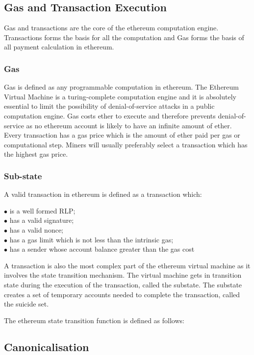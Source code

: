 \documentclass[a4paper,twoside,phd]{BYUPhys}
\begin{document}
\subsection{Gas and Transaction Execution}
Gas and transactions are the core of the ethereum computation engine. Transactions forms the basis for all the computation and Gas forms the basis of all payment calculation in ethereum.
\subsubsection{Gas}
Gas is defined as any programmable computation in ethereum. The Ethereum Virtual Machine is a turing-complete computation engine and it is absolutely essential to limit the possibility of denial-of-service attacks in a public computation engine. Gas costs ether to execute and therefore prevents denial-of-service as no ethereum account is likely to have an infinite amount of ether. Every transaction has a gas price which is the amount of ether paid per gas or computational step. Miners will usually preferably select a transaction which has the highest gas price.
\subsubsection{Sub-state}
A valid transaction in ethereum is defined as a transaction which:
\begin{description}
\item [$\bullet$ is a well formed RLP;]
\item [$\bullet$ has a valid signature;]
\item [$\bullet$ has a valid nonce;]
\item [$\bullet$ has a gas limit which is not less than the intrinsic gas;]
\item [$\bullet$ has a sender whose account balance greater than the gas cost]
\end{description}

A transaction is also the most complex part of the ethereum virtual machine as it involves the state transition mechanism. The virtual machine gets in transition state during the execution of the transaction, called the substate. The substate creates a set of temporary accounts needed to complete the transaction, called the suicide set.

The ethereum state transition function is defined as follows:

\subsection{Canonicalisation}
\end{document}
